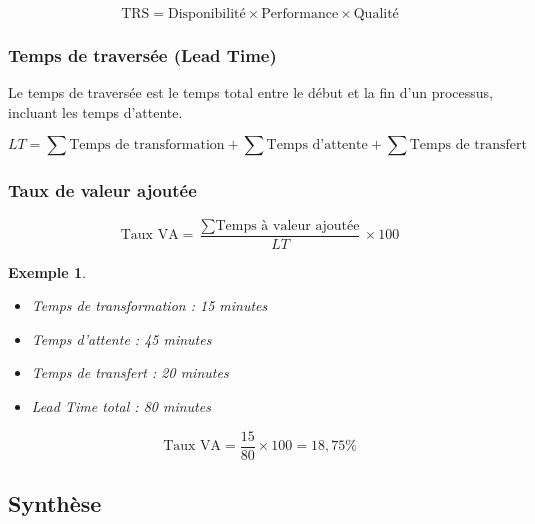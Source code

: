 \documentclass[a4paper,12pt]{article}
\newtheorem{exemple}{Exemple}[section]
\begin{document}
\[
\text{TRS} = \text{Disponibilité} \times \text{Performance} \times \text{Qualité}
\]

\subsubsection{Temps de traversée (Lead Time)}

Le temps de traversée est le temps total entre le début et la fin d'un processus, incluant les temps d'attente.

\[
LT = \sum \text{Temps de transformation} + \sum \text{Temps d'attente} + \sum \text{Temps de transfert}
\]

\subsubsection{Taux de valeur ajoutée}

\[
\text{Taux VA} = \frac{\sum \text{Temps à valeur ajoutée}}{LT} \times 100
\]

\begin{exemple}
\begin{itemize}
    \item Temps de transformation : 15 minutes
    \item Temps d'attente : 45 minutes
    \item Temps de transfert : 20 minutes
    \item Lead Time total : 80 minutes
\end{itemize}

\[
\text{Taux VA} = \frac{15}{80} \times 100 = 18,75\%
\]
\end{exemple}

\subsection{Synthèse}

\begin{center}
\end{center}
\end{document}
